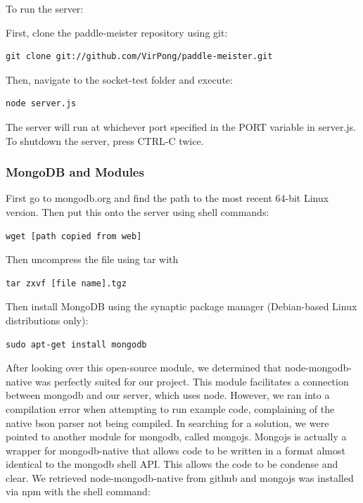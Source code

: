 \documentclass[letterpaper,12pt]{article}
\begin{document}
To run the server:

First, clone the paddle-meister repository using git:

\begin{verbatim}
git clone git://github.com/VirPong/paddle-meister.git
\end{verbatim}

Then, navigate to the socket-test folder and execute:

\begin{verbatim}
node server.js
\end{verbatim}

The server will run at whichever port specified in the PORT variable in server.js. To shutdown the server, press CTRL-C twice.

\subsubsection{MongoDB and Modules}
First go to mongodb.org and find the path to the most recent 64-bit Linux version. Then put this onto the server using shell commands:

\begin{verbatim}
wget [path copied from web]
\end{verbatim}
Then uncompress the file using tar with

\begin{verbatim}
tar zxvf [file name].tgz
\end{verbatim}

Then install MongoDB using the synaptic package manager (Debian-based Linux distributions only):
\begin{verbatim}
sudo apt-get install mongodb
\end{verbatim}

After looking over this open-source module, we determined that node-mongodb-native was perfectly suited for our project. This module facilitates a connection between mongodb and our server, which uses node. However, we ran into a compilation error when attempting to run example code, complaining of the native bson parser not being compiled.
In searching for a solution, we were pointed to another module for mongodb, called mongojs. Mongojs is actually a wrapper for mongodb-native that allows code to be written in a format almost identical to the mongodb shell API. This allows the code to be condense and clear.
We retrieved node-mongodb-native from github and mongojs was installed via npm with the shell command:
\end{document}
